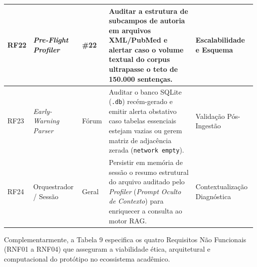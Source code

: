 \documentclass[
	oneside,
	a4paper,
	12pt,
	chapter=TITLE,
	section=TITLE,
	english,
	brazilian
]{abntex2}
\begin{document}
{\begin{xltabular}{\textwidth}{|>{\centering\arraybackslash}p{1.4cm}|>{\raggedright\arraybackslash}p{2.4cm}|>{\centering\arraybackslash}p{1.6cm}|>{\raggedright\arraybackslash}X|>{\raggedright\arraybackslash}p{2.8cm}|}
  RF22 & \textit{Pre-Flight Profiler} & \#22 & Auditar a estrutura de subcampos de autoria em arquivos XML/PubMed e alertar caso o volume textual do corpus ultrapasse o teto de 150.000 sentenças. & Escalabilidade e Esquema \\ \hline
  RF23 & \textit{Early-Warning Parser} & Fórum & Auditar o banco SQLite (\texttt{.db}) recém-gerado e emitir alerta obstativo caso tabelas essenciais estejam vazias ou gerem matriz de adjacência zerada (\texttt{network empty}). & Validação Pós-Ingestão \\ \hline
  RF24 & Orquestrador / Sessão & Geral & Persistir em memória de sessão o resumo estrutural do arquivo auditado pelo \textit{Profiler} (\textit{Prompt Oculto de Contexto}) para enriquecer a consulta ao motor RAG. & Contextualização Diagnóstica \\ \hline
\end{xltabular}
\vspace{-0.2cm}\par\vspace{0.4cm}
}
\FloatBarrier


Complementarmente, a Tabela 9 especifica os quatro Requisitos Não Funcionais (RNF01 a RNF04) que asseguram a viabilidade ética, arquitetural e computacional do protótipo no ecossistema acadêmico.
\end{document}
